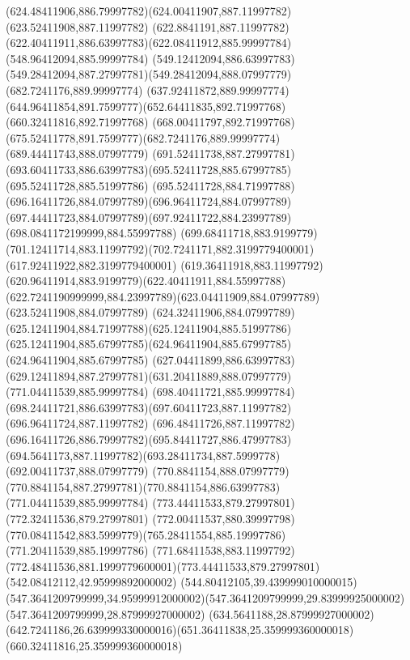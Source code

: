 {{	\curveto(624.48411906,886.79997782)(624.00411907,887.11997782)(623.52411908,887.11997782)
	\curveto(622.8841191,887.11997782)(622.40411911,886.63997783)(622.08411912,885.99997784)
	\lineto(548.96412094,885.99997784)
	\curveto(549.12412094,886.63997783)(549.28412094,887.27997781)(549.28412094,888.07997779)
	\closepath
	\moveto(682.7241176,889.99997774)
	\lineto(637.92411872,889.99997774)
	\curveto(644.96411854,891.7599777)(652.64411835,892.71997768)(660.32411816,892.71997768)
	\curveto(668.00411797,892.71997768)(675.52411778,891.7599777)(682.7241176,889.99997774)
	\closepath
	\moveto(689.44411743,888.07997779)
	\curveto(691.52411738,887.27997781)(693.60411733,886.63997783)(695.52411728,885.67997785)
	\lineto(695.52411728,885.51997786)
	\curveto(695.52411728,884.71997788)(696.16411726,884.07997789)(696.96411724,884.07997789)
	\curveto(697.44411723,884.07997789)(697.92411722,884.23997789)(698.0841172199999,884.55997788)
	\curveto(699.68411718,883.9199779)(701.12411714,883.11997792)(702.7241171,882.3199779400001)
	\lineto(617.92411922,882.3199779400001)
	\curveto(619.36411918,883.11997792)(620.96411914,883.9199779)(622.40411911,884.55997788)
	\curveto(622.7241190999999,884.23997789)(623.04411909,884.07997789)(623.52411908,884.07997789)
	\curveto(624.32411906,884.07997789)(625.12411904,884.71997788)(625.12411904,885.51997786)
	\curveto(625.12411904,885.67997785)(624.96411904,885.67997785)(624.96411904,885.67997785)
	\curveto(627.04411899,886.63997783)(629.12411894,887.27997781)(631.20411889,888.07997779)
	\closepath
	\moveto(771.04411539,885.99997784)
	\lineto(698.40411721,885.99997784)
	\curveto(698.24411721,886.63997783)(697.60411723,887.11997782)(696.96411724,887.11997782)
	\curveto(696.48411726,887.11997782)(696.16411726,886.79997782)(695.84411727,886.47997783)
	\curveto(694.5641173,887.11997782)(693.28411734,887.5999778)(692.00411737,888.07997779)
	\lineto(770.8841154,888.07997779)
	\curveto(770.8841154,887.27997781)(770.8841154,886.63997783)(771.04411539,885.99997784)
	\closepath
	\moveto(773.44411533,879.27997801)
	\lineto(772.32411536,879.27997801)
	\curveto(772.00411537,880.39997798)(770.08411542,883.5999779)(765.28411554,885.19997786)
	\lineto(771.20411539,885.19997786)
	\curveto(771.68411538,883.11997792)(772.48411536,881.1999779600001)(773.44411533,879.27997801)
	\closepath
	\moveto(542.08412112,42.95999892000002)
	\curveto(544.80412105,39.439999010000015)(547.3641209799999,34.95999912000002)(547.3641209799999,29.83999925000002)
	\lineto(547.3641209799999,28.87999927000002)
	\lineto(634.5641188,28.87999927000002)
	\curveto(642.7241186,26.639999330000016)(651.36411838,25.359999360000018)(660.32411816,25.359999360000018)
}}
